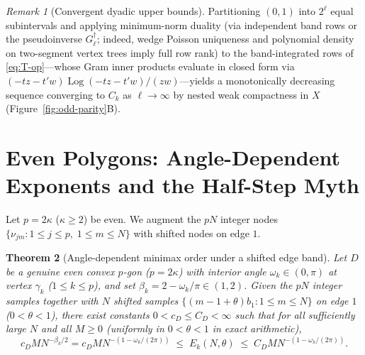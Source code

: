 \documentclass[11pt,reqno]{amsart}
\newtheorem{theorem}{Theorem}[section]
\theoremstyle{definition}
\theoremstyle{remark}
\newtheorem{remark}[theorem]{Remark}
\DeclareMathOperator{\Log}{Log}
\begin{document}
\begin{remark}[Convergent dyadic upper bounds]
Partitioning $(0,1)$ into $2^\ell$ equal subintervals and applying minimum-norm duality (via independent band rows or the pseudoinverse $G_\ell^\dagger$; indeed, wedge Poisson uniqueness and polynomial density on two-segment vertex trees imply full row rank) to the band-integrated rows of \eqref{eq:T-op}---whose Gram inner products evaluate in closed form via $(-tz - t'w)\Log(-tz - t'w)/(zw)$---yields a monotonically decreasing sequence converging to $C_k$ as $\ell \to \infty$ by nested weak compactness in $X$ (Figure~\ref{fig:odd-parity}B).
\end{remark}

\section{Even Polygons: Angle-Dependent Exponents and the Half-Step Myth}\label{sec:even}

Let $p = 2\kappa$ ($\kappa \ge 2$) be even. We augment the $p N$ integer nodes $\{\nu_{jm} : 1 \le j \le p,\; 1 \le m \le N\}$ with shifted nodes on edge $1$.

\begin{theorem}[Angle-dependent minimax order under a shifted edge band]\label{thm:even-exponent}
Let $D$ be a genuine even convex $p$-gon ($p = 2\kappa$) with interior angle $\omega_k \in (0,\pi)$ at vertex $\gamma_k$ ($1 \le k \le p$), and set $\beta_k = 2 - \omega_k/\pi \in (1, 2)$. Given the $p N$ integer samples together with $N$ shifted samples $\{(m - 1 + \theta) b_1 : 1 \le m \le N\}$ on edge $1$ ($0 < \theta < 1$), there exist constants $0 < c_D \le C_D < \infty$ such that for all sufficiently large $N$ and all $M \ge 0$ (uniformly in $0 < \theta < 1$ in exact arithmetic),
\begin{equation}\label{eq:even-rate}
  c_D M N^{-\beta_k / 2} = c_D M N^{-(1 - \omega_k/(2\pi))}
  \;\le\; E_k(N, \theta) \;\le\;
  C_D M N^{-(1 - \omega_k/(2\pi))}.
\end{equation}
\end{theorem}
\end{document}

